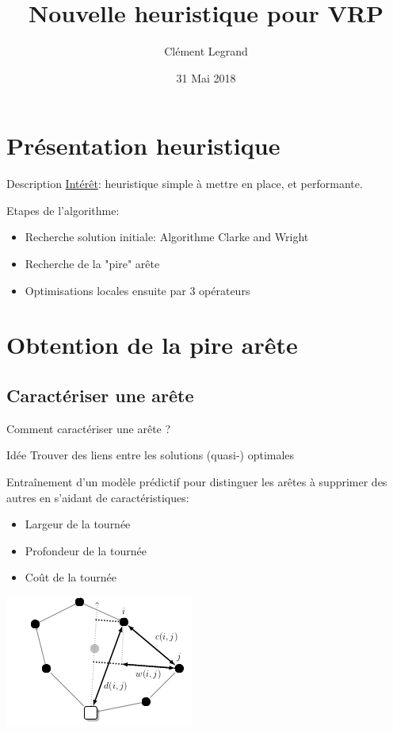 \documentclass{beamer}
\title{Nouvelle heuristique pour VRP}
\author{Clément Legrand}
\date{31 Mai 2018}
\begin{document}
\section{Présentation heuristique}

\begin{frame}[plain]
\titlepage
\end{frame}

\begin{frame}{Description}
\underline{Intérêt}: heuristique simple à mettre en place, et performante.

\begin{block}{Etapes de l'algorithme:}
\begin{itemize}
\item Recherche solution initiale: Algorithme Clarke and Wright

\item Recherche de la "pire" arête

\item Optimisations locales ensuite par 3 opérateurs
\end{itemize}
\end{block}

\end{frame}

\section{Obtention de la pire arête}

\subsection{Caractériser une arête}

\begin{frame}{Comment caractériser une arête ?}
\begin{block}{Idée}
Trouver des liens entre les solutions (quasi-) optimales
\end{block}

Entraînement d'un modèle prédictif pour distinguer
les arêtes à supprimer des autres en s'aidant de caractéristiques:
\begin{itemize}
\item Largeur de la tournée
\item Profondeur de la tournée
\item Coût de la tournée
\end{itemize}

	\centering
	\includegraphics[height=0.4\textheight]{metrics.png}
	
\end{frame}
\end{document}
